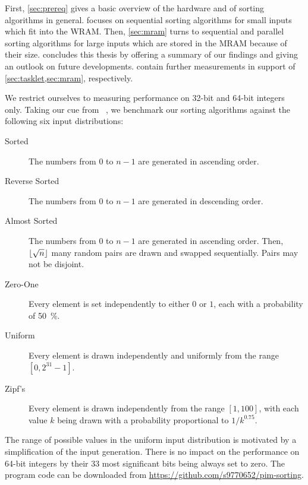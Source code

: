 First, \cref{sec:prereq} gives a basic overview of the \upmem{} hardware and of sorting algorithms in general.
 focuses on sequential sorting algorithms for small inputs which fit into the \acs*{WRAM}.
Then, \cref{sec:mram} turns to sequential and parallel sorting algorithms for large inputs which are stored in the \acs*{MRAM} because of their size.
 concludes this thesis by offering a summary of our findings and giving an outlook on future developments.
 contain further measurements in support of \cref{sec:tasklet,sec:mram}, respectively.

We restrict ourselves to measuring performance on 32-bit and 64-bit integers only.
Taking our cue from \citeauthor{axtmann2020engineering}~\cite{axtmann2020engineering}, we benchmark our sorting algorithms against the following six input distributions:
\begin{description}
	\item[Sorted]
	The numbers from \(0\) to \(n - 1\) are generated in ascending order.

	\item[Reverse Sorted]
	The numbers from \(0\) to \(n - 1\) are generated in descending order.

	\item[Almost Sorted]
	The numbers from \(0\) to \(n - 1\) are generated in ascending order.
	Then, \(\lfloor\sqrt{n}\rfloor\) many random pairs are drawn and swapped sequentially.
	Pairs may not be disjoint.

	\item[Zero-One]
	Every element is set independently to either \(0\) or \(1\), each with a probability of \qty{50}{\percent}.

	\item[Uniform]
	Every element is drawn independently and uniformly from the range \([0, 2^{31} - 1]\).

	\item[Zipf's]
	Every element is drawn independently from the range \([1, 100]\), with each value \(k\) being drawn with a probability proportional to \(1/k^{0.75}\).
\end{description}
The range of possible values in the uniform input distribution is motivated by a simplification of the input generation.
There is no impact on the performance on 64-bit integers by their 33 most significant bits being always set to zero.
The program code can be downloaded from \url{https://github.com/s9770652/pim-sorting}.
